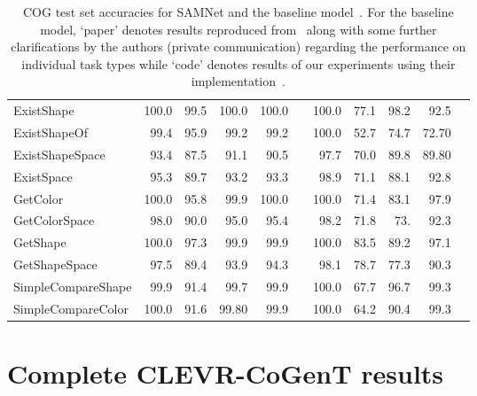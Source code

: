 \begin{table}[htb]
\begin{adjustbox}{width=\textwidth}
\begin{tabular}{l r r r r r r r r r r}
			ExistShape			&	100.0	&	99.5	&	100.0	&	100.0	&	&	100.0	&	77.1	&	98.2	&	92.5 \\
			ExistShapeOf			&	99.4	&	95.9	&	99.2	&	99.2	&	&	100.0	&	52.7	&	74.7	&	72.70 \\
			ExistShapeSpace			&	93.4	&	87.5	&	91.1	&	90.5	&	&	97.7	&	70.0	&	89.8	&	89.80 \\
			ExistSpace			&	95.3	&	89.7	&	93.2	&	93.3	&	&	98.9	&	71.1	&	88.1	&	92.8 \\
			GetColor			&	100.0	&	95.8	&	99.9	&	100.0	&	&	100.0	&	71.4	&	83.1	&	97.9 \\
			GetColorSpace			&	98.0	&	90.0	&	95.0	&	95.4	&	&	98.2	&	71.8	&	73.	&	92.3 \\
			GetShape			&	100.0	&	97.3	&	99.9	&	99.9	&	&	100.0	&	83.5	&	89.2	&	97.1	 \\
			GetShapeSpace			&	97.5	&	89.4	&	93.9	&	94.3	&	&	98.1	&	78.7	&	77.3	&	90.3 \\
			SimpleCompareShape		&	99.9	&	91.4	&	99.7	&	99.9	&	&	100.0	&	67.7	&	96.7	&	99.3 \\
			SimpleCompareColor		&	100.0	&	91.6	&	99.80	&	99.9	&	&	100.0	&	64.2	&	90.4	&	99.3 \\
			\bottomrule[1.25pt]
		\end{tabular}
	\end{adjustbox}
	\smallskip
	\caption{COG test set accuracies for SAMNet and the baseline model~\cite{yang2018dataset}. For the baseline model,
		`paper' denotes results reproduced from~\cite{yang2018dataset} along with some further clarifications by the authors (private communication)  regarding the performance on individual task types while `code' denotes results of our experiments using their implementation~\cite{yang2018implement}.}
	\label{tab:all-results}
\end{table}

\clearpage
\section{Complete CLEVR-CoGenT results}
\label{sec:full-cogent-results}

